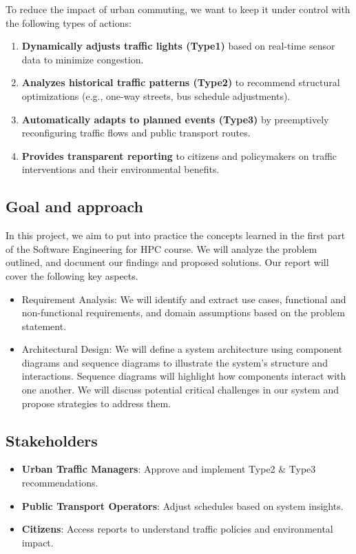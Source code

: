 \documentclass[11.5pt]{article}
\begin{document}
    To reduce the impact of urban commuting, we want to keep it under control with the following types of actions: 
    \begin{enumerate}
        \item \textbf{Dynamically adjusts traffic lights (Type1)} based on real-time sensor data to minimize congestion.
        \item \textbf{Analyzes historical traffic patterns (Type2)} to recommend structural optimizations (e.g., one-way streets, bus schedule adjustments).
        \item \textbf{Automatically adapts to planned events (Type3)} by preemptively reconfiguring traffic flows and public transport routes.
        \item \textbf{Provides transparent reporting} to citizens and policymakers on traffic interventions and their environmental benefits.
    \end{enumerate}

    \subsection{Goal and approach}
    In this project, we aim to put into practice the concepts learned in the first part of the Software Engineering for HPC course. We will analyze the problem outlined, and document our findings and proposed solutions. Our report will cover the following key aspects.
    \begin{itemize}
        \item Requirement Analysis: We will identify and extract use cases, functional and non-functional requirements, and domain assumptions based on the problem statement.

        \item Architectural Design: We will define a system architecture using component diagrams and sequence diagrams to illustrate the system’s structure and interactions. Sequence diagrams will highlight how components interact with one another. We will discuss potential critical challenges in our system and propose strategies to address them.
    \end{itemize}

    \subsection{Stakeholders}
    \begin{itemize}
        \item \textbf{Urban Traffic Managers}: Approve and implement Type2 \& Type3 recommendations.
        \item \textbf{Public Transport Operators}: Adjust schedules based on system insights.
        \item \textbf{Citizens}: Access reports to understand traffic policies and environmental impact.
    \end{itemize}
\end{document}
